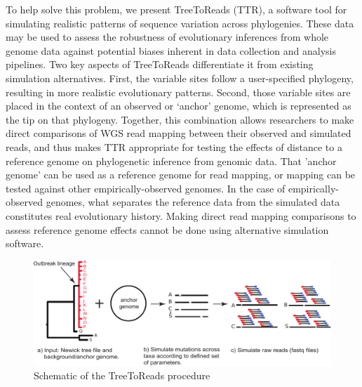 To help solve this problem, we present TreeToReads (TTR), a software tool for simulating realistic patterns of sequence variation across phylogenies.
These data may be used to assess the robustness of evolutionary inferences from whole genome data against potential biases inherent in data collection and analysis pipelines.
Two key aspects of TreeToReads differentiate it from existing simulation alternatives.
First, the variable sites follow a user-specified phylogeny, resulting in more realistic evolutionary patterns.
Second, those variable sites are placed in the context of an observed or `anchor' genome, which is represented as the tip on that phylogeny.
Together, this combination allows researchers to make direct comparisons of WGS read mapping between their observed and simulated reads, 
and thus makes TTR appropriate for testing the effects of distance to a reference genome on phylogenetic inference from genomic data.
That 'anchor genome' can be used as a reference genome for read mapping, or mapping can be tested against other empirically-observed genomes.
In the case of empirically-observed genomes, what separates the reference data from the simulated data constitutes real evolutionary history.
Making direct read mapping comparisons to assess reference genome effects cannot be done using alternative simulation software.



\begin{figure}[trees]
\includegraphics[width=6.5in]{TTR-figure}
\caption{Schematic of the TreeToReads procedure}
\label{scheme}
\end{figure}


